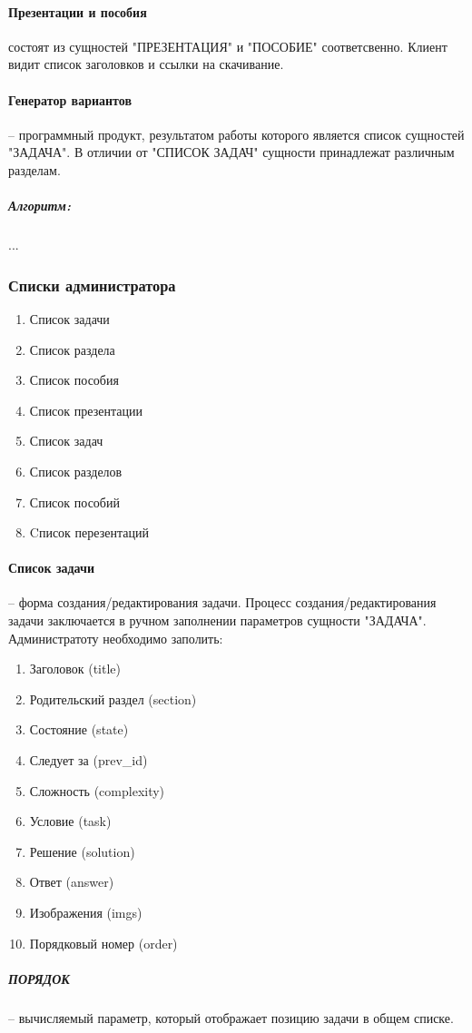 \paragraph{Презентации и пособия} состоят из сущностей "ПРЕЗЕНТАЦИЯ" и "ПОСОБИЕ" соответсвенно. Клиент видит список заголовков и ссылки на скачивание.

\paragraph{Генератор вариантов} -- программный продукт, результатом работы которого является список сущностей "ЗАДАЧА". В отличии от "СПИСОК ЗАДАЧ" сущности принадлежат различным разделам.
\subparagraph{Алгоритм:} ...

\subsubsection{Списки администратора}
\begin{enumerate}
  \item Список задачи
  \item Список раздела
  \item Список пособия
  \item Список презентации
  \item Список задач
  \item Список разделов
  \item Список пособий
  \item Cписок перезентаций
\end{enumerate}

\paragraph{Список задачи} -- форма создания/редактирования задачи.
Процесс создания/редактирования задачи заключается в ручном заполнении параметров сущности "ЗАДАЧА". Администратоту необходимо заполить:
\begin{enumerate}
  \item Заголовок (title)
  \item Родительский раздел (section)
  \item Состояние (state)
  \item Следует за (prev\_id)
  \item Сложность (complexity)
  \item Условие (task)
  \item Решение (solution)
  \item Ответ (answer)
  \item Изображения (imgs)
  \item Порядковый номер (order)
\end{enumerate}
\subparagraph{ПОРЯДОК} -- вычисляемый параметр, который отображает позицию задачи в общем списке.

